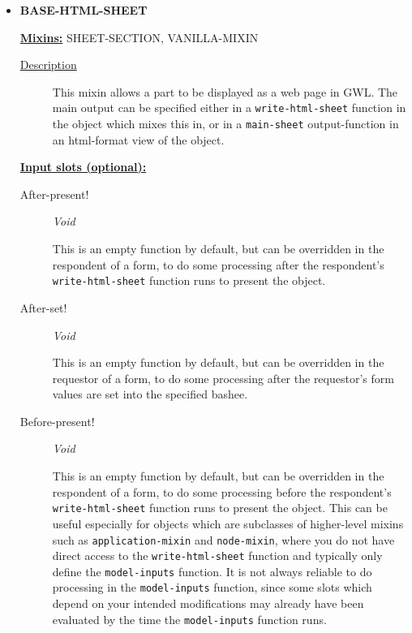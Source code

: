 \documentclass [11pt]{book}
\begin{document}
\begin{itemize}
\item {}
\label{prim:base-html-sheet}
\textbf{BASE-HTML-SHEET}


\textbf{
\underline{Mixins:}} SHEET-SECTION, VANILLA-MIXIN





\begin{description}

\item [
\underline{Description}]


This mixin allows a part to be displayed as a web page in GWL. 
The main output can be specified either in a \texttt{write-html-sheet} function in the object which
mixes  this in, or in a \texttt{main-sheet} output-function in an html-format view of the 
object.



\end{description}








\textbf{
\underline{Input slots (optional):}}

\begin{description}

\item [After-present!]
\emph{Void}

 This is an empty function by default, but can be overridden in
the respondent of a form, to do some processing after the respondent's
\texttt{write-html-sheet} function runs to present the object.




\item [After-set!]
\emph{Void}

 This is an empty function by default, but can be overridden in
the requestor of a form, to do some processing after the requestor's form
values are set into the specified bashee.




\item [Before-present!]
\emph{Void}

 This is an empty function by default, but can be overridden in
the respondent of a form, to do some processing before the respondent's
\texttt{write-html-sheet} function runs to present the object. This can be
useful especially for objects which are subclasses of higher-level mixins such as
\texttt{application-mixin} and \texttt{node-mixin}, where you do not have
direct access to the \texttt{write-html-sheet} function and typically only define
the \texttt{model-inputs} function. It is not always reliable to do processing
in the \texttt{model-inputs} function, since some slots which depend on your
intended modifications may already have been evaluated by the time the
\texttt{model-inputs} function runs.





\end{description}
\end{itemize}
\end{document}
